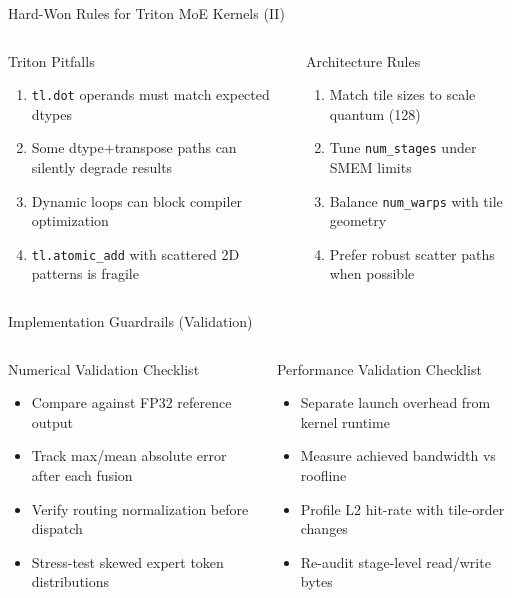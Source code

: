\documentclass[aspectratio=169,11pt]{beamer}
\begin{document}
\begin{frame}[t]{Hard-Won Rules for Triton MoE Kernels (II)}
\small
\begin{columns}[T]
\begin{block}{Triton Pitfalls}
\begin{enumerate}
    \item \texttt{tl.dot} operands must match expected dtypes
    \item Some dtype+transpose paths can silently degrade results
    \item Dynamic loops can block compiler optimization
    \item \texttt{tl.atomic\_add} with scattered 2D patterns is fragile
\end{enumerate}
\end{block}
\begin{block}{Architecture Rules}
\begin{enumerate}
    \item Match tile sizes to scale quantum (128)
    \item Tune \texttt{num\_stages} under SMEM limits
    \item Balance \texttt{num\_warps} with tile geometry
    \item Prefer robust scatter paths when possible
\end{enumerate}
\end{block}
\end{columns}
\end{frame}

\begin{frame}[t]{Implementation Guardrails (Validation)}
\small
\begin{columns}[T]
\begin{block}{Numerical Validation Checklist}
\begin{itemize}
    \item Compare against FP32 reference output
    \item Track max/mean absolute error after each fusion
    \item Verify routing normalization before dispatch
    \item Stress-test skewed expert token distributions
\end{itemize}
\end{block}
\begin{block}{Performance Validation Checklist}
\begin{itemize}
    \item Separate launch overhead from kernel runtime
    \item Measure achieved bandwidth vs roofline
    \item Profile L2 hit-rate with tile-order changes
    \item Re-audit stage-level read/write bytes
\end{itemize}
\end{block}
\end{columns}
\end{frame}
\end{document}
